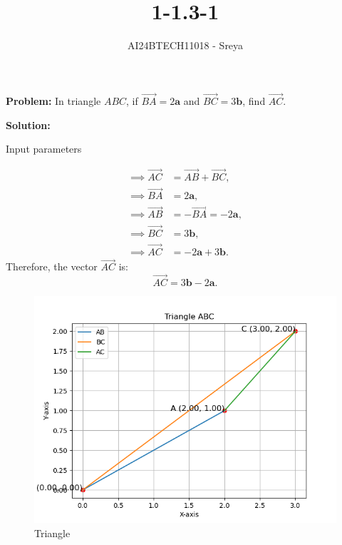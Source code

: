 \documentclass[journal]{IEEEtran}
\begin{document}

\vspace{3cm}

\title{1-1.3-1}
\author{AI24BTECH11018 - Sreya}
{\let\newpage\relax\maketitle}

\renewcommand{\thefigure}{\theenumi}
\renewcommand{\thetable}{\theenumi}
\setlength{\intextsep}{10pt} %


\renewcommand{\thetable}{\theenumi}
\textbf{Problem:}
In triangle \(ABC\), if $\overrightarrow{BA} = 2\mathbf{a}$ and $\overrightarrow{BC} = 3\mathbf{b}$, find $\overrightarrow{AC}$.

\textbf{Solution:}
\begin{table}[h!]
        \centering

        \caption{Input parameters}
\end{table}

\begin{align*}
        \implies \overrightarrow{AC} &= \overrightarrow{AB} + \overrightarrow{BC}, \\
        \implies \overrightarrow{BA} &= 2\mathbf{a}, \\
        \implies \overrightarrow{AB} &= -\overrightarrow{BA} = -2\mathbf{a}, \\
        \implies \overrightarrow{BC} &= 3\mathbf{b}, \\
        \implies \overrightarrow{AC} &= -2\mathbf{a} + 3\mathbf{b}.
\end{align*}
Therefore, the vector $\overrightarrow{AC}$ is: 
\[
\overrightarrow{AC} = 3\mathbf{b} - 2\mathbf{a}.
\]
\begin{figure}[h!]
   \centering
   \includegraphics[width=0.7\linewidth]{Triangle_1.png}
   \caption{Triangle}
\end{figure}
\end{document}
